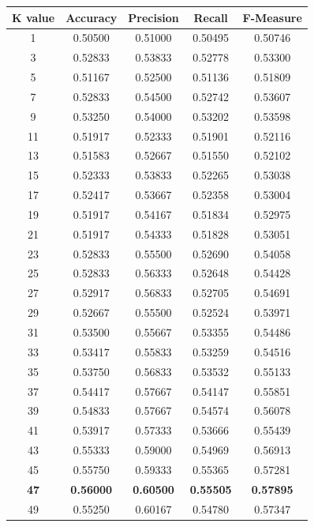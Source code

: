 \documentclass{article}
\begin{document}
\begin{center}
\begin{tabular}{ |c|c|c|c|c| } 
    \hline
    \textbf{K value} & \textbf{Accuracy} & \textbf{Precision} & \textbf{Recall} & \textbf{F-Measure}\\ 
    \hline
    1 &  0.50500 &  0.51000 &  0.50495 &  0.50746 \\
    3 &  0.52833 &  0.53833 &  0.52778 &  0.53300 \\
    5 &  0.51167 &  0.52500 &  0.51136 &  0.51809 \\
    7 &  0.52833 &  0.54500 &  0.52742 &  0.53607 \\
    9 &  0.53250 &  0.54000 &  0.53202 &  0.53598 \\
    11 &  0.51917 &  0.52333 &  0.51901 &  0.52116 \\
    13 &  0.51583 &  0.52667 &  0.51550 &  0.52102 \\
    15 &  0.52333 &  0.53833 &  0.52265 &  0.53038 \\
    17 &  0.52417 &  0.53667 &  0.52358 &  0.53004 \\
    19 &  0.51917 &  0.54167 &  0.51834 &  0.52975 \\
    21 &  0.51917 &  0.54333 &  0.51828 &  0.53051 \\
    23 &  0.52833 &  0.55500 &  0.52690 &  0.54058 \\
    25 &  0.52833 &  0.56333 &  0.52648 &  0.54428 \\
    27 &  0.52917 &  0.56833 &  0.52705 &  0.54691 \\
    29 &  0.52667 &  0.55500 &  0.52524 &  0.53971 \\
    31 &  0.53500 &  0.55667 &  0.53355 &  0.54486 \\
    33 &  0.53417 &  0.55833 &  0.53259 &  0.54516 \\
    35 &  0.53750 &  0.56833 &  0.53532 &  0.55133 \\
    37 &  0.54417 &  0.57667 &  0.54147 &  0.55851 \\
    39 &  0.54833 &  0.57667 &  0.54574 &  0.56078 \\
    41 &  0.53917 &  0.57333 &  0.53666 &  0.55439 \\
    43 &  0.55333 &  0.59000 &  0.54969 &  0.56913 \\
    45 &  0.55750 &  0.59333 &  0.55365 &  0.57281 \\
    \textbf{47} &  \textbf{0.56000} &  \textbf{0.60500} &  \textbf{0.55505} &  \textbf{0.57895} \\
    49 &  0.55250 &  0.60167 &  0.54780 &  0.57347 \\

\end{tabular}
\end{center}
\end{document}
